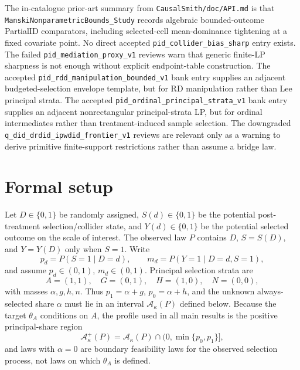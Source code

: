 \documentclass[11pt]{article}
\theoremstyle{definition}
\theoremstyle{plain}
\theoremstyle{remark}
\begin{document}
The in-catalogue prior-art summary from \texttt{CausalSmith/doc/API.md} is that \texttt{ManskiNonparametricBounds\_Study} records algebraic bounded-outcome PartialID comparators, including selected-cell mean-dominance tightening at a fixed covariate point.  No direct accepted \texttt{pid\_collider\_bias\_sharp} entry exists.  The failed \texttt{pid\_mediation\_proxy\_v1} reviews warn that generic finite-LP sharpness is not enough without explicit endpoint-table construction.  The accepted \texttt{pid\_rdd\_manipulation\_bounded\_v1} bank entry supplies an adjacent budgeted-selection envelope template, but for RD manipulation rather than Lee principal strata.  The accepted \texttt{pid\_ordinal\_principal\_strata\_v1} bank entry supplies an adjacent nonrectangular principal-strata LP, but for ordinal intermediates rather than treatment-induced sample selection.  The downgraded \texttt{q\_did\_drdid\_ipwdid\_frontier\_v1} reviews are relevant only as a warning to derive primitive finite-support restrictions rather than assume a bridge law.

\section{Formal setup}
Let \(D\in\{0,1\}\) be randomly assigned, \(S(d)\in\{0,1\}\) be the potential post-treatment selection/collider state, and \(Y(d)\in\{0,1\}\) be the potential selected outcome on the scale of interest.  The observed law \(P\) contains \(D\), \(S=S(D)\), and \(Y=Y(D)\) only when \(S=1\).  Write
\[
  p_d=P(S=1\mid D=d),\qquad
  m_d=P(Y=1\mid D=d,S=1),
\]
and assume \(p_d\in(0,1)\), \(m_d\in(0,1)\).  Principal selection strata are
\[
  A=(1,1),\quad G=(0,1),\quad H=(1,0),\quad N=(0,0),
\]
with masses \(\alpha,g,h,n\).  Thus \(p_1=\alpha+g\), \(p_0=\alpha+h\), and the unknown always-selected share \(\alpha\) must lie in an interval \(\mathcal A_\kappa(P)\) defined below.  Because the target \(\theta_A\) conditions on \(A\), the profile used in all main results is the positive principal-share region
\[
  \mathcal A_\kappa^+(P)=\mathcal A_\kappa(P)\cap(0,\min\{p_0,p_1\}],
\]
and laws with \(\alpha=0\) are boundary feasibility laws for the observed selection process, not laws on which \(\theta_A\) is defined.
\end{document}
